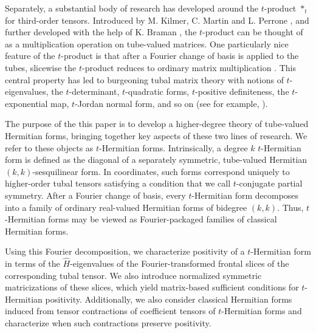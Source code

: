 \documentclass[11pt]{article}
\begin{document}
Separately, a substantial body of research has developed around the $t$-product $*_t$ for third-order tensors. Introduced by M. Kilmer, C. Martin and L. Perrone \cite{kilmer2000third}, and further developed with the help of K. Braman \cite{braman2010third}, the $t$-product can be thought of as a multiplication operation on tube-valued matrices. One particularly nice feature of the $t$-product is that after a Fourier change of basis is applied to the tubes, slicewise the $t$-product reduces to ordinary matrix multiplication \cite{kilmer2013third}. This central property has led to burgeoning tubal matrix theory with notions of $t$-eigenvalues, the $t$-determinant, $t$-quadratic forms, $t$-positive definiteness, the $t$-exponential map, $t$-Jordan normal form, and so on (see for example, \cite{gleich2013power,qi2021t,zheng2021t,miao2021t}).

The purpose of the this paper is to develop a higher-degree theory of tube-valued Hermitian forms, bringing together key aspects of these two lines of research. We refer to these objects as $t$-Hermitian forms. Intrinsically, a degree $k$ $t$-Hermitian form is defined as the diagonal of a separately symmetric, tube-valued Hermitian $(k,k)$-sesquilinear form. In coordinates, such forms correspond uniquely to higher-order tubal tensors satisfying a condition that we call $t$-conjugate partial symmetry. After a Fourier change of basis, every $t$-Hermitian form decomposes into a family of ordinary real-valued Hermitian forms of bidegree $(k,k)$. Thus, $t$-Hermitian forms may be viewed as Fourier-packaged families of classical Hermitian forms.

Using this Fourier decomposition, we characterize positivity of a $t$-Hermitian form in terms of the $\widehat{H}$-eigenvalues of the Fourier-transformed frontal slices of the corresponding tubal tensor. We also introduce normalized symmetric matricizations of these slices, which yield matrix-based sufficient conditions for $t$-Hermitian positivity. Additionally, we also consider classical Hermitian forms induced from tensor contractions of coefficient tensors of $t$-Hermitian forms and characterize when such contractions preserve positivity. 
\end{document}
